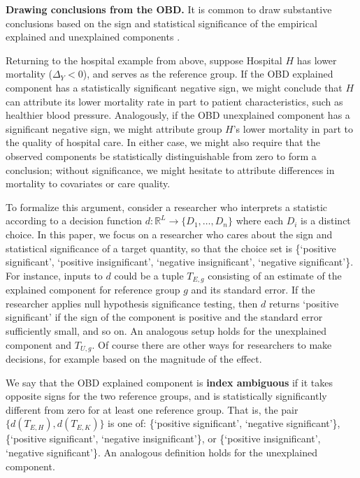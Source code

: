 \textbf{Drawing conclusions from the OBD.}
It is common to draw substantive conclusions based on the sign and statistical significance of the empirical explained and unexplained components \citep{oaxacaRansom1998, jann2008,fortinLemieuxFirpo2011}. 

Returning to the hospital example from above, suppose Hospital $H$ has lower mortality ($\Delta_Y < 0$), and serves as the reference group. 
If the OBD explained component has a statistically significant negative sign, we might conclude that $H$ can attribute
its lower mortality rate in part to patient characteristics, such as healthier blood pressure. 
Analogously, if the OBD unexplained component has a significant negative sign, we might attribute group $H$'s lower
mortality in part to the quality of hospital care.
In either case, we might also require that the observed components be statistically distinguishable from zero to form a conclusion; without significance, we might hesitate to attribute differences in mortality to covariates or care quality. 

To formalize this argument, consider a researcher who interprets a statistic according to a decision function $d: \mathbb{R}^L \to \{ D_1, \dots, D_n \}$ where each $D_i$ is a distinct choice.
In this paper, we focus on a researcher who cares about the sign and statistical significance of a target quantity, so that the choice set is \{`positive significant', `positive insignificant', `negative insignificant', `negative significant'\}.
For instance, inputs to $d$ could be a tuple $T_{E,g}$ consisting of an estimate of the explained component for reference group $g$ and its standard error.
If the researcher applies null hypothesis significance testing, then $d$ returns `positive significant' if the sign of the component is positive and the standard error sufficiently small, and so on.
An analogous setup holds for the unexplained component and $T_{U,g}$.
Of course there are other ways for researchers to make decisions, for example based on the magnitude of the effect.

We say that the OBD explained component is \textbf{index ambiguous} if it takes opposite signs for the two reference groups, and is statistically significantly different from zero for at least one reference group.
That is, the pair $\{ d(T_{E,H}), d(T_{E,K}) \}$ is one of: \{`positive significant', `negative significant'\}, \{`positive significant', `negative insignificant'\}, or \{`positive insignificant', `negative significant'\}.
An analogous definition holds for the unexplained component.

